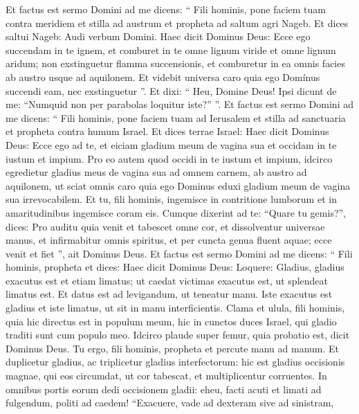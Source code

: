 \begin{biblechapter}
\begin{biblechapter}
\begin{biblechapter}
\begin{biblechapter}
\begin{biblechapter}
\begin{biblechapter}
\begin{biblechapter}
\begin{biblechapter}
\begin{biblechapter}
\begin{biblechapter}
\begin{biblechapter}
\begin{biblechapter}
\begin{biblechapter}
\begin{biblechapter}
\begin{biblechapter}
\begin{biblechapter}
\begin{biblechapter}
\begin{biblechapter}
\begin{biblechapter}
\begin{biblechapter}
\begin{biblechapter}
\verse Et factus est sermo Domini ad me dicens: 
\verse “ Fili hominis, pone faciem tuam contra meridiem et stilla ad austrum et propheta ad saltum agri Nageb. 
\verse Et dices saltui Nageb: Audi verbum Domini. Haec dicit Dominus Deus: Ecce ego succendam in te ignem, et comburet in te omne lignum viride et omne lignum aridum; non exstinguetur flamma succensionis, et comburetur in ea omnis facies ab austro usque ad aquilonem. 
\verse Et videbit universa caro quia ego Domínus succendi eam, nec exstinguetur ”. 
\verse Et dixi: “ Heu, Domine Deus! Ipsi dicunt de me: “Numquid non per parabolas loquitur iste?” ”.
 \verse Et factus est sermo Domini ad me dicens: 
\verse “ Fili hominis, pone faciem tuam ad Ierusalem et stilla ad sanctuaria et propheta contra humum Israel. 
\verse Et dices terrae Israel: Haec dicit Dominus Deus: Ecce ego ad te, et eiciam gladium meum de vagina sua et occidam in te iustum et impium. 
\verse Pro eo autem quod occidi in te iustum et impium, idcirco egredietur gladius meus de vagina sua ad omnem carnem, ab austro ad aquilonem, 
\verse ut sciat omnis caro quia ego Dominus eduxi gladium meum de vagina sua irrevocabilem.
 \verse Et tu, fili hominis, ingemisce in contritione lumborum et in amaritudinibus ingemisce coram eis. 
\verse Cumque dixerint ad te: “Quare tu gemis?”, dices: Pro auditu quia venit et tabescet omne cor, et dissolventur universae manus, et infirmabitur omnis spiritus, et per cuncta genua fluent aquae; ecce venit et fiet ”, ait Dominus Deus.
 \verse Et factus est sermo Domini ad me dicens: 
\verse “ Fili hominis, propheta et dices: Haec dicit Dominus Deus: Loquere:
 Gladius, gladius exacutus est
 et etiam limatus;
 \verse ut caedat victimas exacutus est,
 ut splendeat limatus est.
 \verse Et datus est ad levigandum,
 ut teneatur manu.
 Iste exacutus est gladius et iste limatus,
 ut sit in manu interficientis.
 \verse Clama et ulula, fili hominis,
 quia hic directus est in populum meum,
 hic in cunctos duces Israel,
 qui gladio traditi sunt cum populo meo.
 \verse Idcirco plaude super femur,
 quia probatio est,
 dicit Dominus Deus.
 \verse Tu ergo, fili hominis,
 propheta et percute manu ad manum.
 Et duplicetur gladius,
 ac triplicetur gladius interfectorum: hic est gladius occisionis magnae,
 qui eos circumdat,
 \verse ut cor tabescat,
 et multiplicentur corruentes.
 In omnibus portis eorum
 dedi occisionem gladii:
 eheu, facti acuti et limati ad fulgendum,
 politi ad caedem!
 \verse “Exacuere, vade ad dexteram sive ad sinistram,

\end{biblechapter}
\end{biblechapter}
\end{biblechapter}
\end{biblechapter}
\end{biblechapter}
\end{biblechapter}
\end{biblechapter}
\end{biblechapter}
\end{biblechapter}
\end{biblechapter}
\end{biblechapter}
\end{biblechapter}
\end{biblechapter}
\end{biblechapter}
\end{biblechapter}
\end{biblechapter}
\end{biblechapter}
\end{biblechapter}
\end{biblechapter}
\end{biblechapter}
\end{biblechapter}
